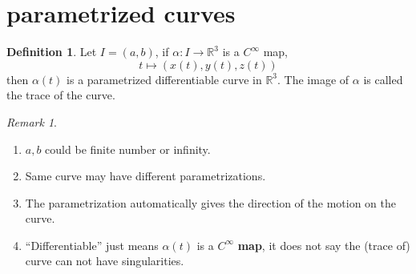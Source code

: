 \documentclass[UTF8,oneside,11pt]{book}
\theoremstyle{plain}\newtheorem{thm}{Theorem}
\theoremstyle{definition}\newtheorem{defn}[thm]{Definition}
\theoremstyle{plain}\newtheorem{axiom}[thm]{Axiom}
\theoremstyle{plain}\newtheorem{coro}[thm]{Corollary}
\theoremstyle{plain}\newtheorem{lemma}[thm]{Lemma}
\theoremstyle{plain}\newtheorem{prop}[thm]{Proposition}
\theoremstyle{plain}\newtheorem{conj}[thm]{Conjecture}
\theoremstyle{plain}\newtheorem{ques}[thm]{Problem}
\theoremstyle{plain}\newtheorem{const}[thm]{Construction}
\theoremstyle{remark}\newtheorem{notation}[thm]{Notation}
\theoremstyle{plain}\newtheorem*{app}{Application}
\theoremstyle{plain}\newtheorem*{exam}{Example}
\theoremstyle{plain}\newtheorem*{exer}{Exercise}
\theoremstyle{remark}\newtheorem*{remark}{Remark}
\theoremstyle{remark}\newtheorem*{note}{\small{Note}}
\numberwithin{equation}{section}
\numberwithin{thm}{section}
\begin{document}
\section{parametrized curves}
\begin{defn}
    Let $I=\left(a,b\right)$, if $\alpha\colon I\to \mathbb{R}^3$ is a $C^\infty$ map,
    \[t \mapsto \left(x\left(t\right),y\left(t\right),z\left(t\right)\right)\]
    then $\alpha\left(t\right)$ is a parametrized differentiable curve in $\mathbb{R}^3$. The image of $\alpha$ is called the trace of the curve. 
\end{defn}
\begin{remark}
    \hfill
    \begin{enumerate}[1)]
        \item $a,b$ could be finite number or infinity.
        \item Same curve may have different parametrizations.
        \item The parametrization automatically gives the direction of the motion on the curve.
        \item ``Differentiable'' just means $\alpha\left(t\right)$ is a $C^\infty$ \textbf{map}, it does not say the (trace of) curve can not have singularities.
    \end{enumerate}
    
\end{remark}
\end{document}
